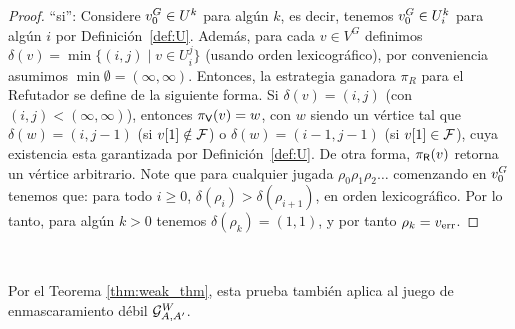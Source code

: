 \begin{proof}
``si'': Considere $\InitVertex^G \in U^k$ para algún $k$, es decir, tenemos  $\InitVertex^G \in U^k_i$ para algún $i$ por Definición~\ref{def:U}. 
Además, para cada $v \in V^G$ definimos $\delta(v) = \min \{ (i,j) \mid v \in U^j_i \}$ (usando orden lexicográfico), por conveniencia asumimos $\min \emptyset = (\infty, \infty)$.
Entonces, la estrategia ganadora $\pi_R$ para el Refutador se define de la siguiente forma. Si $\delta(v) = (i,j)$ (con $(i,j) < (\infty, \infty)$), entonces $\pi_\Verifier(v) = w$, con $w$ siendo un vértice tal que
$\delta(w) = (i,j-1)$ (si $\pr{1}{v} \notin \Faults$) o $\delta(w) = (i-1,j-1)$ (si $\pr{1}{v} \in \Faults$), cuya existencia esta garantizada por Definición~\ref{def:U}. De otra forma, $\pi_\Refuter(v)$ retorna
un vértice arbitrario. Note que para cualquier jugada $\rho_0 \rho_1 \rho_2 \dots$ comenzando en $\InitVertex^G$ tenemos que:  para todo $i \geq 0$, $\delta(\rho_i) > \delta(\rho_{i+1})$, en orden lexicográfico.
Por lo tanto, para algún $k>0$ tenemos $\delta(\rho_k) = (1,1)$, y por tanto $\rho_k = \ErrorSt$.
\qedhere
\end{proof} \\
\fi

Por el Teorema \ref{thm:weak_thm}, esta prueba también aplica al juego de enmascaramiento débil $\WeakMaskGG$.
